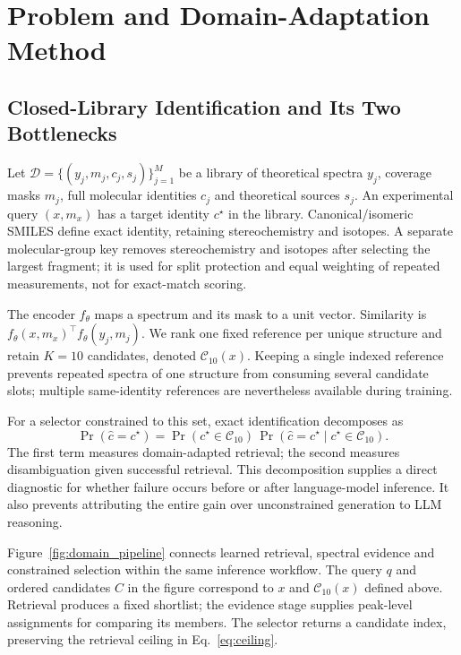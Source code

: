 \section{Problem and Domain-Adaptation Method}\label{sec:method}
\subsection{Closed-Library Identification and Its Two Bottlenecks}
Let $\mathcal{D}=\{(y_j,m_j,c_j,s_j)\}_{j=1}^{M}$ be a library of theoretical spectra $y_j$, coverage masks $m_j$, full molecular identities $c_j$ and theoretical sources $s_j$. An experimental query $(x,m_x)$ has a target identity $c^\star$ in the library. Canonical/isomeric SMILES define exact identity, retaining stereochemistry and isotopes. A separate molecular-group key removes stereochemistry and isotopes after selecting the largest fragment; it is used for split protection and equal weighting of repeated measurements, not for exact-match scoring.

The encoder $f_\theta$ maps a spectrum and its mask to a unit vector. Similarity is $f_\theta(x,m_x)^\top f_\theta(y_j,m_j)$. We rank one fixed reference per unique structure and retain $K=10$ candidates, denoted $\mathcal{C}_{10}(x)$. Keeping a single indexed reference prevents repeated spectra of one structure from consuming several candidate slots; multiple same-identity references are nevertheless available during training.

For a selector constrained to this set, exact identification decomposes as
\begin{equation}\label{eq:ceiling}
\Pr(\hat c=c^\star)=\Pr(c^\star\in\mathcal{C}_{10})\,
\Pr(\hat c=c^\star\mid c^\star\in\mathcal{C}_{10}).
\end{equation}
The first term measures domain-adapted retrieval; the second measures disambiguation given successful retrieval. This decomposition supplies a direct diagnostic for whether failure occurs before or after language-model inference. It also prevents attributing the entire gain over unconstrained generation to LLM reasoning.

Figure~\ref{fig:domain_pipeline} connects learned retrieval, spectral evidence and constrained selection within the same inference workflow. The query $q$ and ordered candidates $C$ in the figure correspond to $x$ and $\mathcal{C}_{10}(x)$ defined above. Retrieval produces a fixed shortlist; the evidence stage supplies peak-level assignments for comparing its members. The selector returns a candidate index, preserving the retrieval ceiling in Eq.~\eqref{eq:ceiling}.




